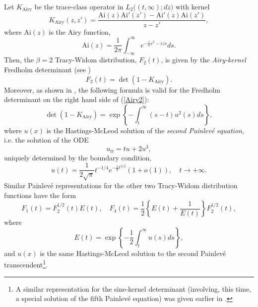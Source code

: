 \documentclass[11pt,letterpaper,reqno]{amsart}
\theoremstyle{definition}
\theoremstyle{remark}
\numberwithin{equation}{section}
\begin{document}
Let $K_{\textrm{Airy}}$ be the  trace-class operator in $L_2\bigl((t, \infty); dz\bigr)$ with kernel
\begin{equation}\label{Airy0}
K_{\textrm{Airy}}(z, z') = \frac{\textrm{Ai}(z)\textrm{Ai}'(z') - \textrm{Ai}'(z)\textrm{Ai}(z')}{z - z'},
\end{equation}
where $\textrm{Ai}(z)$ is the Airy function,
$$
\textrm{Ai}(z) = \frac{1}{2\pi}\int_{-\infty}^{\infty}e^{-\frac{i}{3}s^3 - izs}ds.
$$
Then, the  $\beta =2$  Tracy-Widom distribution, $F_{2}(t)$, is given
by the {\it Airy-kernel}  Fredholm determinant (see \cite{For})
\begin{equation}\label{Airy2}
F_{2}(t) = \det \left(1 - K_{\textrm{Airy}}\right).
\end{equation}
Moreover, as  shown in \cite{75}, the following  formula is
valid for the  Fredholm determinant on the right hand side of (\ref{Airy2}):
\begin{equation}\label{TW1}
 \det(1 - K_{\textrm{Airy}}) = \exp\left\{ - \int_{t}^{\infty}(s-t)u^2(s)ds\right\},
\end{equation}
where $u(x)$ is the Hastings-McLeod solution of the {\it second Painlev\'e
equation}, i.e. the solution of the ODE
\begin{equation}\label{painleve}
u_{tt} = tu +2u^3,
\end{equation}
uniquely determined by the boundary condition,
\begin{equation}\label{painleve2}
u(t) = \frac{1}{2\sqrt{\pi}}t^{-1/4}e^{-\frac{2}{3}t^{3/2}}(1 + o(1)), \quad t \to +\infty.
\end{equation}
Similar Painlev\'e  representations for the other two Tracy-Widom distribution functions
have the form \cite{84}
\begin{equation}\label{TW14}
F_{1}(t) = F_{2}^{1/2}(t)E(t), \quad F_{4}(t) = \frac{1}{2}\left\{E(t) + \frac{1}{E(t)}\right\}F_{2}^{1/2}(t),
\end{equation}
where
$$
E(t) = \exp\left\{ - \frac{1}{2}\int_{t}^{\infty}u(s)ds\right\},
$$
and $u(x)$ is the same Hastings-McLeod solution to the second Painlev\'e transcendent{\footnote{A similar  representation
for the sine-kernel determinant (involving, this time,  a special solution of the fifth Painlev\'e equation) was given earlier in \cite{JMMS}.}}.
\end{document}
